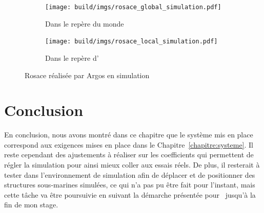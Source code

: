 			\begin{figure}[!htb]
				\centering
				\begin{subfigure}[t]{0.48\textwidth}
					\centering
					\texttt{[image: build/imgs/rosace\_global\_simulation.pdf]}
					\caption{Dans le repère du monde}
				\end{subfigure}
				\hfill
				\begin{subfigure}[t]{0.48\textwidth}
					\centering
					\texttt{[image: build/imgs/rosace\_local\_simulation.pdf]}
					\caption{Dans le repère d'\argos{}}
				\end{subfigure}
				\caption{Rosace réalisée par Argos en simulation}
				\label{fig:rosace_argos_simulation}
			\end{figure}

	\section{Conclusion}

		En conclusion, nous avons montré dans ce chapitre que le système mis en place correspond aux exigences mises en place dans le Chapitre~\ref{chapitre:systeme}. Il reste cependant des ajustements à réaliser sur les coefficients qui permettent de régler la simulation pour ainsi mieux coller aux essais réels. De plus, il resterait à tester \atoll{} dans l'environnement de simulation afin de déplacer et de positionner des structures sous-marines simulées, ce qui n'a pas pu être fait pour l'instant, mais cette tâche va être poursuivie en suivant la démarche présentée pour \argos{} jusqu'à la fin de mon stage.